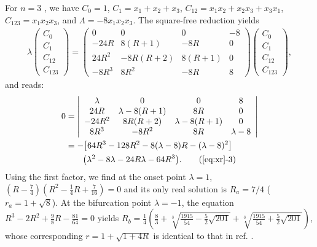 \documentclass[twocolumn]{revtex4-1}
\begin{document}
For $n = 3$ \cite{saha, bechhoefer, gordon, burm, zhang},
we have
$C_0 = 1$,
$C_1 = x_1 + x_2 + x_3$,
$C_{12} = x_1 x_2 + x_2 x_3 + x_3 x_1$,
$C_{123} = x_1 x_2 x_3$,
and
$\Lambda = -8 x_1 x_2 x_3$.
%
The square-free reduction yields
%
%
%
\footnotesize
\begin{align*}
\lambda
\left( \begin{array}{c}
  C_0 \\
  C_1 \\
  C_{12} \\
  C_{123}
\end{array} \right)
=
\left( \begin{array}{cccc}
 0            & 0                 & 0               & -8 \\
 -24 R        & 8(R+1)            & -8R             & 0 \\
 24 R^2       & -8R(R+2)          & 8(R+1)          & 0 \\
 -8R^3        & 8R^2              & -8R             & 8
  \end{array} \right)
\left( \begin{array}{c}
  C_0 \\
  C_1 \\
  C_{12} \\
  C_{123}
\end{array} \right),
\end{align*}
\normalsize
%
%
%
and  reads:
%
\begin{align}
  0
&=\left| \begin{array}{cccc}
 \lambda      & 0                 & 0               & 8 \\
 24 R         & \lambda - 8(R+1)  & 8R              & 0 \\
 -24 R^2      & 8R(R+2)           & \lambda-8(R+1)  & 0 \\
 8R^3         & -8R^2             & 8R              & \lambda-8
  \end{array} \right| \nonumber \\
&= -\big[
  64R^3 - 128 R^2 - 8 (\lambda - 8) R - (\lambda -8)^2
  \big] \notag \\
&\qquad
  \big(
  \lambda^2 - 8\lambda - 24 R\lambda - 64 R^3
  \big).
  \tag{\ref{eq:xr}-3}
\label{eq:xr3}
\end{align}
%
Using the first factor, we find at the onset point
  $\lambda = 1$,
  $\left(
  R-\frac74
  \right)
  \left(
  R^2-\frac14 R + \frac{7}{16}
  \right)=0$
  and its only real solution is $R_a = 7/4$ ($r_a = 1+\sqrt 8$).
%
At the bifurcation point $\lambda = -1$,
  the equation $R^3-2R^2 + \frac{9}{8} R -\frac{81}{64}=0$
  yields
  $R_b = \frac14
      \left(
      \frac{8}{3} +
        \sqrt[3]{\frac{1915}{54} - \frac52\sqrt{201}}
       +\sqrt[3]{\frac{1915}{54} + \frac52\sqrt{201}}
      \right)$,
whose corresponding $r = 1+\sqrt{1+4R}$
is identical to that in ref. \cite{gordon, burm}.
%
\end{document}
